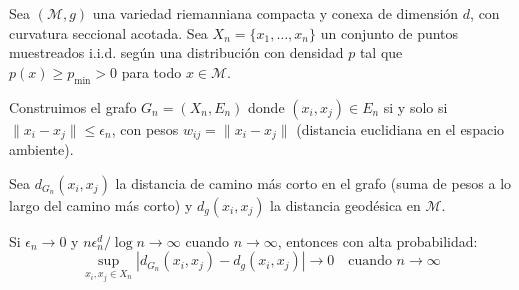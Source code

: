 \begin{theorem}\label{thm:convergencia_distancias_geodesicas}
	Sea $(\mathcal{M}, g)$ una variedad riemanniana compacta y conexa de dimensión $d$, con curvatura seccional acotada. Sea $X_n = \{x_1, \ldots, x_n\}$ un conjunto de puntos muestreados i.i.d. según una distribución con densidad $p$ tal que $p(x) \geq p_{\min} > 0$ para todo $x \in \mathcal{M}$.

	Construimos el grafo $G_n = (X_n, E_n)$ donde $(x_i, x_j) \in E_n$ si y solo si $\|x_i - x_j\| \leq \epsilon_n$, con pesos $w_{ij} = \|x_i - x_j\|$ (distancia euclidiana en el espacio ambiente).

	Sea $d_{G_n}(x_i, x_j)$ la distancia de camino más corto en el grafo (suma de pesos a lo largo del camino más corto) y $d_g(x_i, x_j)$ la distancia geodésica en $\mathcal{M}$.

	Si $\epsilon_n \to 0$ y $n \epsilon_n^d / \log n \to \infty$ cuando $n \to \infty$, entonces con alta probabilidad:
	\[
		\sup_{x_i, x_j \in X_n} \left| d_{G_n}(x_i, x_j) - d_g(x_i, x_j) \right| \to 0 \quad \text{cuando } n \to \infty
	\]
\end{theorem}

